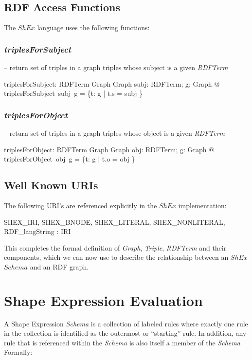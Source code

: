 \documentclass[fuzz]{llncs}
\def\zc{\textit}
\begin{document}
\subsection{RDF Access Functions}

The $ShEx$ language uses the following functions:

\subsubsection{\zc{triplesForSubject}} -- return set of triples in a graph triples whose subject is a given \zc{RDFTerm}
\begin{axdef}
   triplesForSubject: RDFTerm \fun Graph \fun Graph
\where
   \forall subj: RDFTerm; g: Graph @ triplesForSubject~subj~g = \{t: g | t.s = subj \}
\end{axdef}

\subsubsection{\zc{triplesForObject}} -- return set of triples in a graph triples whose object is a given \zc{RDFTerm}
\begin{axdef}
   triplesForObject: RDFTerm \fun Graph \fun Graph
\where
   \forall obj: RDFTerm; g: Graph @ triplesForObject~obj~g = \{t: g | t.o = obj \}
\end{axdef}

\subsection{Well Known URIs}

The following URI's are referenced explicitly in the $ShEx$ implementation:

\begin{axdef}
SHEX\_IRI, SHEX\_BNODE, SHEX\_LITERAL, SHEX\_NONLITERAL, \\
RDF\_langString : IRI
\end{axdef}

This completes the formal definition of \zc{Graph}, \zc{Triple}, \zc{RDFTerm} and their components, which we can now use to describe the relationship between an $ShEx$ $Schema$ and an RDF graph.

\section{Shape Expression Evaluation}
A Shape Expression \zc{Schema} is a collection of labeled rules where exactly one rule in the collection is identified as the outermost or ``starting'' rule. In addition, any rule 
that is referenced within the \zc{Schema} is also itself a member of the \zc{Schema} Formally:
\end{document}
